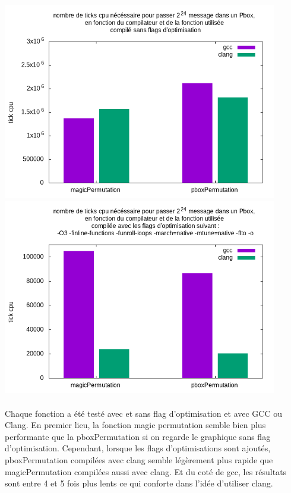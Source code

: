 \documentclass{report}
\begin{document}
\includegraphics[width=12cm]{../src/benchmarks/permutation/img/permutation.png} \\ 
\includegraphics[width=12cm]{../src/benchmarks/permutation/img/permutation_opti.png}

\paragraph{} Chaque fonction a été testé avec et sans flag d'optimisation et avec GCC ou Clang. 
En premier lieu, la fonction magic permutation semble bien plus performante que la pboxPermutation si on regarde le graphique sans flag d'optimisation.
Cependant, lorsque les flags d'optimisations sont ajoutés, pboxPermutation compilées avec clang semble légèrement plus rapide que magicPermutation compilées aussi avec clang.
Et du coté de gcc, les résultats sont entre 4 et 5 fois plus lents ce qui conforte dans l'idée d'utiliser clang.
\end{document}
